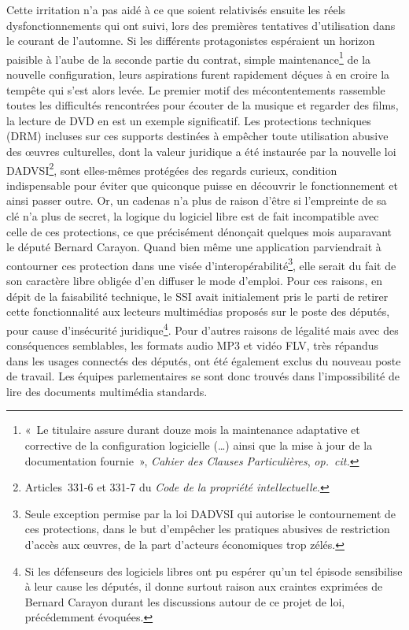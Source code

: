 \documentclass{FramateX}
\begin{document}
\begin{refsection}
Cette irritation n'a pas aidé à ce que soient relativisés ensuite les
réels dysfonctionnements qui ont suivi, lors des premières tentatives
d'utilisation dans le courant de l'automne. Si les différents
protagonistes espéraient un horizon paisible à l'aube de la seconde
partie du contrat, simple maintenance\footnote{«~Le titulaire assure
durant douze mois la maintenance adaptative et corrective de la
configuration logicielle (…) ainsi que la mise à jour de la
documentation fournie~», \textit{Cahier des Clauses Particulières},
\textit{op.~cit.}} de la nouvelle configuration, leurs aspirations
furent rapidement déçues à en croire la tempête qui s'est alors levée.
Le premier motif des mécontentements rassemble toutes les difficultés
rencontrées pour écouter de la musique et regarder des films, la
lecture de DVD en est un exemple significatif. Les protections
techniques (DRM) incluses sur ces supports destinées à empêcher toute
utilisation abusive des œuvres culturelles, dont la valeur juridique a
été instaurée par la nouvelle loi DADVSI\footnote{Articles~331-6 et
331-7 du \textit{Code de la propriété intellectuelle}.}, sont elles-mêmes
protégées des regards curieux, condition indispensable pour éviter que
quiconque puisse en découvrir le fonctionnement et ainsi passer outre.
Or, un cadenas n'a plus de raison d'être si l'empreinte de sa clé n'a
plus de secret, la logique du logiciel libre est de fait incompatible
avec celle de ces protections, ce que précisément dénonçait quelques
mois auparavant le député Bernard Carayon. Quand bien même une
application parviendrait à contourner ces protection dans une visée
d'interopérabilité\footnote{Seule exception permise par la loi DADVSI
qui autorise le contournement de ces protections, dans le but
d'empêcher les pratiques abusives de restriction d'accès aux œuvres, de
la part d'acteurs économiques trop zélés.}, elle serait du fait de son
caractère libre obligée d'en diffuser le mode d'emploi. Pour ces
raisons, en dépit de la faisabilité technique, le SSI avait
initialement pris le parti de retirer cette fonctionnalité aux lecteurs
multimédias proposés sur le poste des députés, pour cause d'insécurité
juridique\footnote{Si les défenseurs des logiciels libres ont pu
espérer qu'un tel épisode sensibilise à leur cause les députés, il
donne surtout raison aux craintes exprimées de Bernard Carayon durant
les discussions autour de ce projet de loi, précédemment évoquées.}.
Pour d'autres raisons de légalité mais avec des conséquences
semblables, les formats audio MP3 et vidéo FLV, très répandus dans les
usages connectés des députés, ont été également exclus du nouveau poste
de travail. Les équipes parlementaires se sont donc trouvés dans
l'impossibilité de lire des documents multimédia standards.


\end{refsection}
\end{document}
